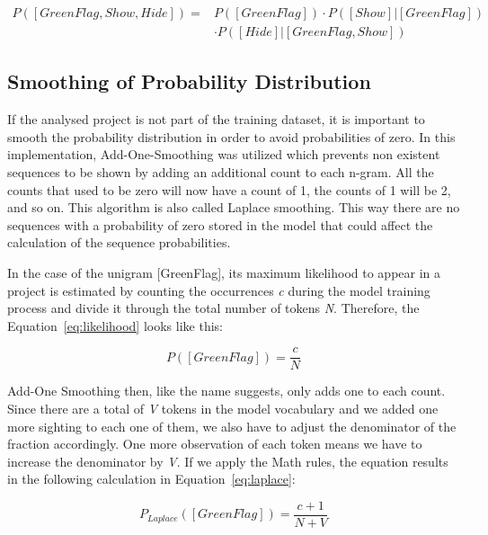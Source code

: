 \begin{equation} \label{eq:scratch-prob}
\begin{aligned}
P([GreenFlag, Show, Hide]) ={} & P([GreenFlag])\cdot P([Show]|[GreenFlag]) \\
							  & \cdot P([Hide]|[GreenFlag, Show])
\end{aligned}
\end{equation}


\subsection{Smoothing of Probability Distribution}\label{subsec:smoothing}
If the analysed project is not part of the training dataset, it is important to smooth the probability distribution in order to avoid probabilities of zero. In this implementation, Add-One-Smoothing was utilized which prevents non existent sequences to be shown by adding an additional count to each n-gram.
All the counts that used to be zero will now have a count of 1, the counts of 1 will be 2, and so on. This algorithm is also called Laplace smoothing. This way there are no sequences with a probability of zero stored in the model that could affect the calculation of the sequence probabilities.

In the case of the unigram [GreenFlag], its maximum likelihood to appear in a \scratch{} project is estimated by counting the occurrences \textit{c} during the model training process and divide it through the total number of tokens \textit{N}. Therefore, the Equation~\ref{eq:likelihood} looks like this:

\begin{equation} \label{eq:likelihood}
P([GreenFlag]) ={} \frac{c}{N}
\end{equation}

Add-One Smoothing then, like the name suggests, only adds one to each count. Since there are a total of \textit{V} tokens in the model vocabulary and we added one more sighting to each one of them, we also have to adjust the denominator of the fraction accordingly. One more observation of each token means we have to increase the denominator by \textit{V}. If we apply the Math rules, the equation results in the following calculation in Equation~\ref{eq:laplace}:

\begin{equation} \label{eq:laplace}
P_{Laplace}([GreenFlag]) ={} \frac{c + 1}{N + V}
\end{equation}


